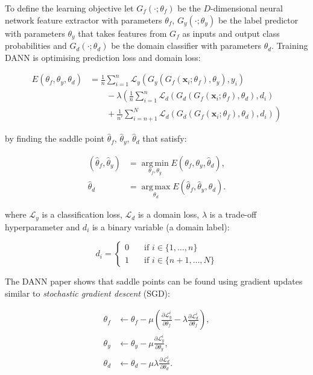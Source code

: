 To define the learning objective let
\(G_f(\cdot; \theta_f)\) be the \(D\)-dimensional neural network feature extractor with parameters \(\theta_f\),
\(G_y(\cdot; \theta_y)\) be the label predictor with parameters \(\theta_y\)
that takes features from \(G_f\) as inputs and output class probabilities
and \(G_d(\cdot; \theta_d)\) be the domain classifier with parameters \(\theta_d\). 
Training DANN is optimising prediction loss and domain loss:

\begin{align}
	E(\theta_f, \theta_y, \theta_d) &= \frac{1}{n} \sum^{n}_{i = 1} \mathcal{L}_y(G_y(G_f(\mathbf{x}_i; \theta_f), \theta_y), y_i) \nonumber \\
	&\qquad {} - \lambda \left(\frac{1}{n} \sum^{n}_{i = 1} \mathcal{L}_d(G_d(G_f(\mathbf{x}_i; \theta_f), \theta_d), d_i) \right. \nonumber \\
	&\qquad \left. {} + \frac{1}{n'} \sum^{N}_{i = n + 1} \mathcal{L}_d(G_d(G_f(\mathbf{x}_i; \theta_f), \theta_d), d_i)\right)
\end{align}

by finding the saddle point \(\hat{\theta}_f\), \(\hat{\theta}_y\), \(\hat{\theta}_d\) that satisfy:

\begin{align}
	(\hat{\theta}_f, \hat{\theta}_y)
	&= \operatorname*{arg\,min}_{\theta_f, \theta_y} E(\theta_f, \theta_y, \hat{\theta}_d),\\
	\hat{\theta}_d
	&= \operatorname*{arg\,max}_{\theta_d} E(\hat{\theta}_f, \hat{\theta}_y, \theta_d).
\end{align}

where \(\mathcal{L}_y\) is a classification loss,
\(\mathcal{L}_d\) is a domain loss,
\(\lambda\) is a trade-off hyperparameter
and \(d_i\) is a binary variable (a domain label):

\begin{equation}
	d_i =
	\begin{cases}
		0 & \quad \text{if } i \in \{1, \dots, n\} \\
		1 & \quad \text{if } i \in \{n + 1, \dots, N\}
	\end{cases}
\end{equation}

The DANN paper shows that saddle points can be found using gradient updates
similar to \textit{stochastic gradient descent} (SGD):

\begin{align}
	\theta_f &\gets \theta_f - \mu \left(
	\frac{\partial \mathcal{L}_y^i}{\partial \theta_f}
	- \lambda \frac{\partial \mathcal{L}_d^i}{\partial \theta_f}
	\right),
	\label{feature_parameters_update} \\
	\theta_y &\gets \theta_y - \mu
	\frac{\partial \mathcal{L}_y^i}{\partial \theta_y}, \\
	\theta_d &\gets \theta_d - \mu \lambda
	\frac{\partial \mathcal{L}_d^i}{\partial \theta_d}.
\end{align}

